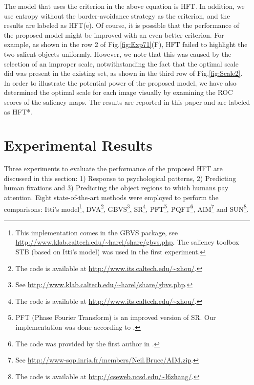 \documentclass[10pt,journal,cspaper,compsoc]{IEEEtran}
\begin{document}
The model that uses the criterion in the above equation is HFT. In addition, we use entropy without  the border-avoidance strategy as the criterion, and the results are labeled as HFT(e). Of course, it is possible that the performance of the proposed model might be improved with an even better criterion. For example, as shown in the row 2 of Fig.\ref{fig:Exp71}(F), HFT failed to highlight the two salient objects uniformly. However, we note that this was caused by the selection of an improper scale, notwithstanding the fact that the optimal scale did was present in the existing set, as shown in the third row of Fig.\ref{fig:Scale2}. In order to illustrate the potential power of the proposed model, we have also determined the optimal scale for each image visually by examining the ROC scores of the saliency maps. The results are reported in this paper and are labeled as HFT*.
\section{Experimental Results}
\label{Sec:Experiment}

Three experiments to evaluate the performance of the proposed HFT are discussed in this section: 1) Response to psychological patterns, 2) Predicting human fixations and 3) Predicting the object regions to which humans pay attention. Eight state-of-the-art methods were employed to perform the comparisons: Itti's model\cite{Itti_etal98pami}\footnote{This implementation comes in the GBVS package, see \url{http://www.klab.caltech.edu/~harel/share/gbvs.php}. The saliency toolbox STB (based on Itti's model) was used in the first experiment.}, DVA\cite{NIPS2008_0142}\footnote{The code is available at \url{http://www.its.caltech.edu/~xhou/}.}, GBVS\cite{NIPS2006_897}\footnote{ See \url{http://www.klab.caltech.edu/~harel/share/gbvs.php}.}, SR\cite{hou2007saliency}\footnote{The code is available at \url{http://www.its.caltech.edu/~xhou/}.}, PFT\cite{guo2008spatio}\footnote{PFT (Phase Fourier Transform) is an improved version of SR. Our implementation was done according to \cite{guo2008spatio}.}, PQFT\cite{guo2008spatio,guo2010multiresolution}\footnote{The code was provided by the first author in \cite{guo2010multiresolution}.}, AIM\cite{NIPS2005_81}\footnote{
See \url{http://www-sop.inria.fr/members/Neil.Bruce/AIM.zip}.} and SUN\cite{zhang2008sun}\footnote{The code is available at \url{http://cseweb.ucsd.edu/~l6zhang/}.}.
\end{document}

